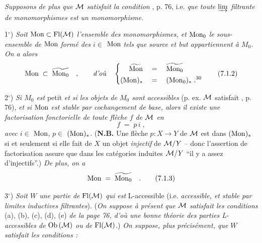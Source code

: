 \textit{Supposons de plus que $\mathcal{M}$ satisfait la condition} , p. 76, i.e. \textit{que toute $\varinjlim$ filtrante de monomorphismes est un monomorphisme.}

1$^{\circ}$) \textit{Soit} $\mathrm{Mon} \subset \mathrm{Fl}(\mathcal{M})$ \textit{l'ensemble des monomorphismes, et} $\mathrm{Mon}_0$ \textit{le sous-ensemble de} $\mathrm{Mon}$ \textit{formé des $i \in$} $\mathrm{Mon}$ \textit{tels que source et but appartiennent à $M_0$. On a alors}
\[
\Mon \;\subset\; \widetilde{\Mon_0} \quad , \qquad \text{\textit{d'où}} \quad
\left\{
\begin{aligned}
\widetilde{\Mon} \quad &= \quad \widetilde{\Mon_0} \\
(\Mon)_{*} \quad &= \quad (\Mon_0)_{*} \;.\text{\footnotemark[30]}
\end{aligned}
\right.
\tag*{(7.1.2)}
\]

2$^{\circ}$) \textit{Si $M_0$ est} petit \textit{et si les objets de $M_0$ sont accessibles} (p. ex. $\mathcal{M}$ satisfait , p. 76), \textit{et si} $\mathrm{Mon}$ \textit{est stable par cochangement de base, alors il existe une factorisation fonctorielle de toute flèche $f$ de $\mathcal{M}$ en}
\[
f \;=\; p\, i \;,
\]
\textit{avec $i \in$} $\mathrm{Mon}$, \textit{$p \in$} $(\mathrm{Mon})_{*}$. (\textbf{N.B.} Une flèche $p : X \longrightarrow Y$ de $\mathcal{M}$ est dans $(\mathrm{Mon})_{*}$ si et seulement si elle fait de $X$ un objet \textit{injectif} de $\mathcal{M}/Y$ -- donc l'assertion de factorisation assure que dans les catégories induites $\mathcal{M}/Y$ “il y a assez d'injectifs”.) \textit{De plus, on a}
\[
\Mon \;=\; \widetilde{\Mon_0} \quad .
\tag*{(7.1.3)}
\]

3$^{\circ}$) \textit{Soit $W$ une partie de} $\mathrm{Fl}(\mathcal{M})$ \textit{qui est} L-accessible (i.e. \textit{accessible, et stable par limites inductives filtrantes}). (\textit{On suppose à présent que $\mathcal{M}$ satisfait les conditions} (a), (b), (c), (d), (e) \textit{de la page 76, d'où une bonne théorie des parties L-accessibles de} $\mathrm{Ob}\,(\mathcal{M})$ \textit{ou de} $\mathrm{Fl}(\mathcal{M})$.) \textit{On suppose, plus précisément, que $W$ satisfait les conditions :}

